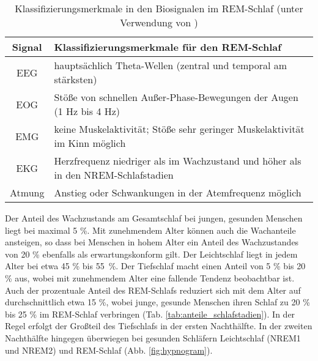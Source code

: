 \begin{table}[H] 
\begin{small}
\begin{tabularx}{\textwidth}{cX}
\toprule
\multicolumn{1}{c}{\textbf{Signal}} & \multicolumn{1}{l}{\textbf{Klassifizierungsmerkmale für den \acs{REM}-Schlaf}}\\  
\midrule
\acs{EEG} & hauptsächlich Theta-Wellen (zentral und temporal am stärksten)\\
\acs{EOG} & Stöße von schnellen Außer-Phase-Bewegungen der Augen (1 Hz bis 4 Hz)\\
\acs{EMG} & keine Muskelaktivität; Stöße sehr geringer Muskelaktivität im Kinn möglich\\
\acs{EKG} & Herzfrequenz niedriger als im Wachzustand und höher als in den \acs{NREM}-Schlafstadien\\
Atmung & Anstieg oder Schwankungen in der Atemfrequenz möglich\\
\bottomrule
\end{tabularx}
\caption[Klassifizierungsmerkmale im \acs{REM}-Schlaf]{Klassifizierungsmerkmale in den Biosignalen im \acs{REM}-Schlaf (unter Verwendung von \parencite{lee-chiong_sleep_2008, steinberg_schlafmedizin_2010, rasche_update_2003, ebner_eeg_2006})}
\label{tab:rem}
\end{small}
\end{table}


Der Anteil des Wachzustands am Gesamtschlaf bei jungen, gesunden Menschen liegt bei maximal 5 \%. Mit zunehmendem Alter können auch die Wachanteile ansteigen, so dass bei Menschen in hohem Alter ein Anteil des Wachzustandes von 20 \% ebenfalls als erwartungskonform gilt. Der Leichtschlaf liegt in jedem Alter bei etwa 45 \% bis 55~\%. Der Tiefschlaf macht einen Anteil von 5 \% bis 20 \% aus, wobei mit zunehmendem Alter eine fallende Tendenz beobachtbar ist. Auch der prozentuale Anteil des \acs{REM}-Schlafs reduziert sich mit dem Alter auf durchschnittlich etwa 15 \%, wobei junge, gesunde Menschen ihren Schlaf zu 20 \% bis 25 \% im \acs{REM}-Schlaf verbringen (Tab. \ref{tab:anteile_schlafstadien}). In der Regel erfolgt der Großteil des Tiefschlafs in der ersten Nachthälfte. In der zweiten Nachthälfte hingegen überwiegen bei gesunden Schläfern Leichtschlaf (\acs{NREM}1 und \acs{NREM}2) und \acs{REM}-Schlaf (Abb. \ref{fig:hypnogram}). \parencite{lee-chiong_sleep_2008, steinberg_schlafmedizin_2010, danker-hopfe_percentile_2005}


